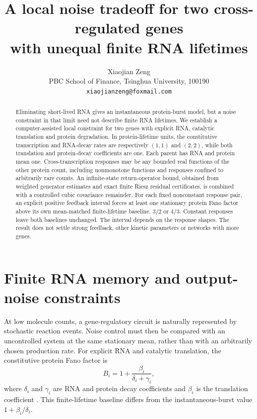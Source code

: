 \documentclass[11pt]{article}
\title{A local noise tradeoff for two cross-regulated genes\\
with unequal finite RNA lifetimes}
\author{Xiaojian Zeng\\
\small PBC School of Finance, Tsinghua University, 100190\\
\small \texttt{xiaojianzeng@foxmail.com}}
\date{}
\begin{document}
\maketitle
\begin{abstract}
Eliminating short-lived RNA gives an instantaneous protein-burst model,
but a noise constraint in that limit need not describe finite RNA lifetimes.
We establish a computer-assisted local constraint for two genes with explicit
RNA, catalytic translation and protein degradation. In protein-lifetime units,
the constitutive transcription and RNA-decay rates are respectively $(1,1)$
and $(2,2)$, while both translation and protein-decay coefficients are one.
Each parent has RNA and protein mean one. Cross-transcription responses may
be any bounded real functions of the other protein count, including
nonmonotone functions and responses confined to arbitrarily rare counts.
An infinite-state return-operator bound, obtained from weighted generator
estimates and exact finite Riesz residual certificates, is combined with a
controlled cubic covariance remainder. For each fixed nonconstant response
pair, an explicit positive feedback interval forces at least one stationary
protein Fano factor above its own mean-matched finite-lifetime baseline,
$3/2$ or $4/3$. Constant responses leave both baselines unchanged.
The interval depends on the response shapes. The result does not settle
strong feedback, other kinetic parameters or networks with more genes.
\end{abstract}

\section{Finite RNA memory and output-noise constraints}

At low molecule counts, a gene-regulatory circuit is naturally represented
by stochastic reaction events. Noise control must then be compared with
an uncontrolled system at the same stationary mean, rather than with an
arbitrarily chosen production rate. For explicit RNA and catalytic
translation, the constitutive protein Fano factor is
\begin{equation}
 B_i=1+\frac{\beta_i}{\delta_i+\gamma_i},
 \label{eq:baseline}
\end{equation}
where $\delta_i$ and $\gamma_i$ are RNA and protein decay coefficients
and $\beta_i$ is the translation coefficient
\citep{Thattai2001,Shahrezaei2008}. This finite-lifetime baseline differs
from the instantaneous-burst value $1+\beta_i/\delta_i$.
\end{document}
